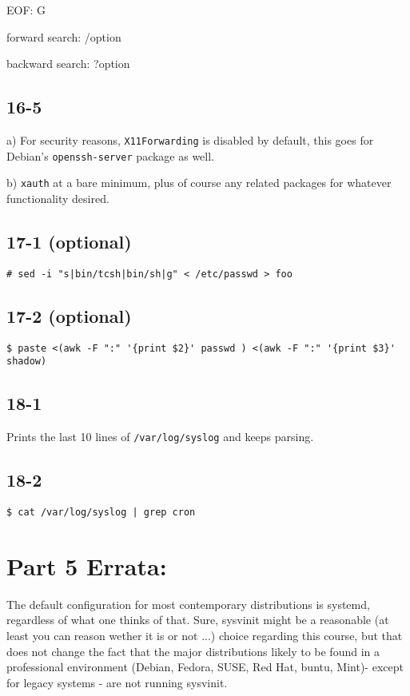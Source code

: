 EOF: G

forward search: /option

backward search: ?option

\subsection{16-5}
a) For security reasons, \verb=X11Forwarding= is disabled by default, this goes for Debian's \verb=openssh-server= package as well.

b) \verb=xauth= at a bare minimum, plus of course any related packages for whatever functionality desired.

\subsection{17-1 (optional)}
\verb=# sed -i "s|bin/tcsh|bin/sh|g" < /etc/passwd > foo=

\subsection{17-2 (optional)}
\begin{verbatim}$ paste <(awk -F ":" '{print $2}' passwd ) <(awk -F ":" '{print $3}' shadow)\end{verbatim}

\subsection{18-1}
Prints the last 10 lines of \verb=/var/log/syslog= and keeps parsing.

\subsection{18-2}
\verb=$ cat /var/log/syslog | grep cron=


\section{Part 5 Errata:}
The default configuration for most contemporary distributions is systemd, regardless of what one thinks of that. Sure, sysvinit might be a reasonable (at least you can reason wether it is or not ...) choice regarding this course, but that does not change the fact that the major distributions likely to be found in a professional environment (Debian, Fedora, SUSE, Red Hat, \*buntu, Mint)- except for legacy systems - are not running sysvinit.

